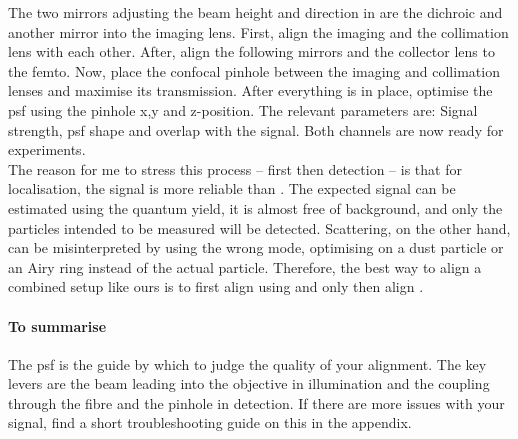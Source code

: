         The two mirrors adjusting the beam height and direction in \scat are the dichroic and another mirror into the imaging lens. First, align the imaging and the collimation lens with each other. After, align the following mirrors and the collector lens to the \gls{femto}. Now, place the confocal pinhole between the imaging and collimation lenses and maximise its transmission. After everything is in place, optimise the \gls{psf} using the pinhole x,y and z-position. The relevant parameters are: Signal strength, \gls{psf} shape and overlap with the \fl signal. Both channels are now ready for experiments\cite{nichols2011video}. \\ 
        The reason for me to stress this process -- first \fl then \scat detection -- is that for localisation, the \fl signal is more reliable than \scat. The expected signal can be estimated using the quantum yield, it is almost free of background, and only the particles intended to be measured will be detected. Scattering, on the other hand, can be misinterpreted by using the wrong mode, optimising on a dust particle or an Airy ring instead of the actual particle. Therefore, the best way to align a combined setup like ours is to first align using \fl and only then align \scat.
		
		\paragraph{To summarise}
			 The \gls{psf} is the guide by which to judge the quality of your alignment. The key levers are the beam leading into the objective in illumination and the coupling through the fibre and the pinhole in detection. If there are more issues with your signal, find a short troubleshooting guide on this in the appendix.
    
